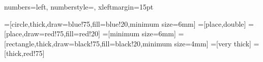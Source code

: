\documentclass[acmsmall]{acmart}
\begin{document}
\newcommand{\etc}{\emph{etc}\xspace}
\newcommand{\wrt}{\emph{wrt.}\xspace}
\newcommand{\ie}{\emph{i.e.}\xspace}
\newcommand{\Ie}{\emph{I.e.}\xspace}
\newcommand{\eg}{\emph{e.g.}\xspace}
\newcommand{\Eg}{\emph{E.g.}\xspace}
\newcommand{\etal}{\emph{et~al.}\xspace}
\newcommand{\tygar}{\tname{TYGAR}}
\newcommand{\emphbf}[1]{\emph{\textbf{#1}\xspace}}
\newcommand{\mypara}[1]{\smallskip\noindent\emphbf{#1.}\xspace}
\newcommand{\setof}[1]{\ensuremath{\{ #1 \}}}
\newcommand{\sem}[1]{\ensuremath{\llbracket #1 \rrbracket}}

\newcommand{\mFixType}{\emph{Baseline}\xspace}
\newcommand{\mNoGar}{\emph{NOGAR}\xspace}
\newcommand{\mTopType}{\emph{\tygar-0}\xspace}
\newcommand{\mQryType}{\emph{\tygar-Q}\xspace}
\newcommand{\mQryTypeBounded}{\emph{\tygar-QB}\xspace}

\newif\ifdraft
\draftfalse

\ifdraft
\newcommand\authorrnote[3]{\textcolor{#1}{({#2}: {#3})}\xspace}
\newcommand{\TODO}[1]{{\color{orange!80!black}[\textsl{#1}]}}
\else
\newcommand\authorrnote[2]{}
\newcommand{\TODO}[1]{}
\fi

\newcommand{\nex}{\ensuremath{E}}
\newcommand{\tname}[1]{\textsc{#1}\xspace}
\newcommand{\tool}{\tname{H+}}
\newcommand{\sys}{\tool}
\newcommand{\hoogle}{\tname{Hoogle}}
\newcommand{\agda}{\tname{Agda}}
\newcommand{\sypet}{\tname{SyPet}}
\newcommand{\insynth}{\tname{InSynth}}
\newcommand{\prospector}{\tname{Prospector}}
\newcommand{\blaze}{\tname{Blaze}}
\newcommand{\djinn}{\tname{Djinn}}
\newcommand{\synquid}{\tname{Synquid}}
\newcommand{\myth}{\tname{Myth2}}
\newcommand{\corelang}{$\lambda_H$\xspace}



{
  numbers=left,
  numberstyle=\sf,
  xleftmargin=15pt
}

\newcommand{\T}[1]{\mbox{\lstinline[language=Haskell,basicstyle=\ttfamily,columns=fixed]^#1^}}


=[circle,thick,draw=blue!75,fill=blue!20,minimum size=6mm]
=[place,double]
=[place,draw=red!75,fill=red!20]
=[minimum size=6mm]
=[rectangle,thick,draw=black!75,fill=black!20,minimum size=4mm]
=[very thick]
=[thick,red!75]
\end{document}
